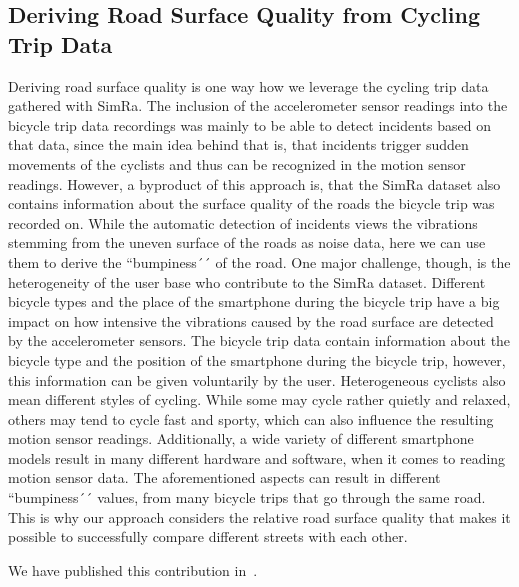 \subsection{Deriving Road Surface Quality from Cycling Trip Data}
\label{subsec:road_surface_contribution}
Deriving road surface quality is one way how we leverage the cycling trip data gathered with SimRa.
The inclusion of the accelerometer sensor readings into the bicycle trip data recordings was mainly to be able to detect incidents based on that data, since the main idea behind that is, that incidents trigger sudden movements of the cyclists and thus can be recognized in the motion sensor readings.
However, a byproduct of this approach is, that the SimRa dataset also contains information about the surface quality of the roads the bicycle trip was recorded on.
While the automatic detection of incidents views the vibrations stemming from the uneven surface of the roads as noise data, here we can use them to derive the ``bumpiness´´ of the road.
One major challenge, though, is the heterogeneity  of the user base who contribute to the SimRa dataset.
Different bicycle types and the place of the smartphone during the bicycle trip have a big impact on how intensive the vibrations caused by the road surface are detected by the accelerometer sensors.
The bicycle trip data contain information about the bicycle type and the position of the smartphone during the bicycle trip, however, this information can be given voluntarily by the user.
Heterogeneous cyclists also mean different styles of cycling.
While some may cycle rather quietly and relaxed, others may tend to cycle fast and sporty, which can also influence the resulting motion sensor readings.
Additionally, a wide variety of different smartphone models result in many different hardware and software, when it comes to reading motion sensor data.
The aforementioned aspects can result in different ``bumpiness´´ values, from many bicycle trips that go through the same road.
This is why our approach considers the relative road surface quality that makes it possible to successfully compare different streets with each other.

We have published this contribution in~\cite{karakaya2023crowdsensing}.

